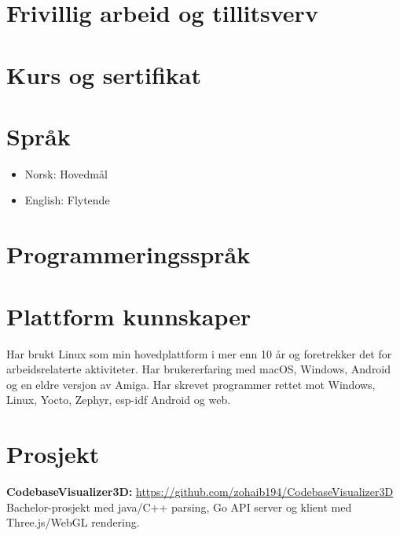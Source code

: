 \documentclass[norsk]{../crudecv/crudecv}
\begin{document}
\section*{Frivillig arbeid og tillitsverv}
\begin{experiences}
\end{experiences}

\section*{Kurs og sertifikat}
\begin{experiences}
\end{experiences}

\section*{Språk}
\begin{itemize}
\item Norsk: Hovedmål
\item English: Flytende
\end{itemize}


\section*{Programmeringsspråk}
\begin{skills}
\end{skills}

\section*{Plattform kunnskaper}
Har brukt Linux som min hovedplattform i mer enn 10 år og foretrekker det for
arbeidsrelaterte aktiviteter. Har brukererfaring med macOS, Windows, Android
og en eldre versjon av Amiga. Har skrevet programmer rettet mot Windows,
Linux, Yocto, Zephyr, esp-idf Android og web.

\section*{Prosjekt}
\textbf{CodebaseVisualizer3D:} \hfill \href{https://github.com/zohaib194/CodebaseVisualizer3D}{https://github.com/zohaib194/CodebaseVisualizer3D} \\
Bachelor-prosjekt med java/C++ parsing, Go API server og klient med Three.js/WebGL rendering.
\end{document}
